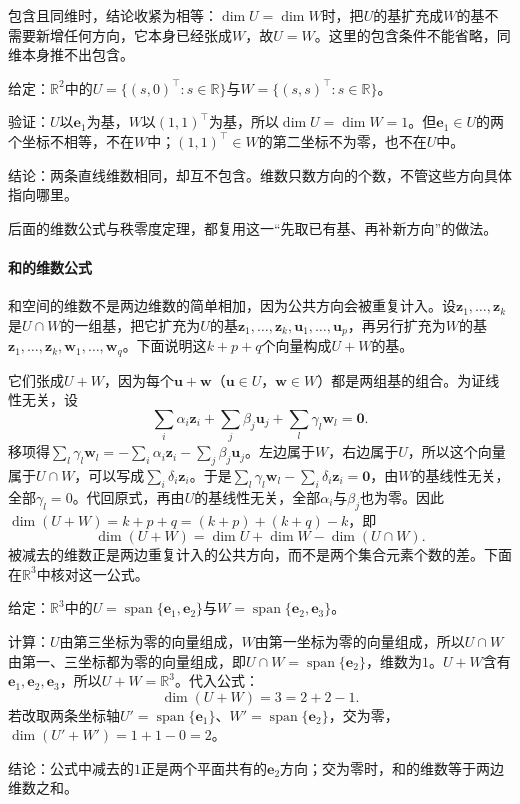 包含且同维时，结论收紧为相等：$\dim U=\dim W$时，把$U$的基扩充成$W$的基不需要新增任何方向，它本身已经张成$W$，故$U=W$。这里的包含条件不能省略，同维本身推不出包含。
\begin{example}[反例：同维而互不包含的两条直线]
\label{ex:ls-equal-dimension-not-nested}
给定：$\mathbb R^2$中的$U=\{(s,0)^\top:s\in\mathbb R\}$与$W=\{(s,s)^\top:s\in\mathbb R\}$。

验证：$U$以$\bm e_1$为基，$W$以$(1,1)^\top$为基，所以$\dim U=\dim W=1$。但$\bm e_1\in U$的两个坐标不相等，不在$W$中；$(1,1)^\top\in W$的第二坐标不为零，也不在$U$中。

结论：两条直线维数相同，却互不包含。维数只数方向的个数，不管这些方向具体指向哪里。
\end{example}
后面的维数公式与秩零度定理，都复用这一“先取已有基、再补新方向”的做法。

\paragraph{和的维数公式}
和空间的维数不是两边维数的简单相加，因为公共方向会被重复计入。设$\bm z_1,\ldots,\bm z_k$是$U\cap W$的一组基，把它扩充为$U$的基$\bm z_1,\ldots,\bm z_k,\bm u_1,\ldots,\bm u_p$，再另行扩充为$W$的基$\bm z_1,\ldots,\bm z_k,\bm w_1,\ldots,\bm w_q$。下面说明这$k+p+q$个向量构成$U+W$的基。

它们张成$U+W$，因为每个$\bm u+\bm w$（$\bm u\in U$，$\bm w\in W$）都是两组基的组合。为证线性无关，设
\[
 \sum_i\alpha_i\bm z_i+\sum_j\beta_j\bm u_j+\sum_l\gamma_l\bm w_l=\bm0 .
\]
移项得$\sum_l\gamma_l\bm w_l=-\sum_i\alpha_i\bm z_i-\sum_j\beta_j\bm u_j$。左边属于$W$，右边属于$U$，所以这个向量属于$U\cap W$，可以写成$\sum_i\delta_i\bm z_i$。于是$\sum_l\gamma_l\bm w_l-\sum_i\delta_i\bm z_i=\bm0$，由$W$的基线性无关，全部$\gamma_l=0$。代回原式，再由$U$的基线性无关，全部$\alpha_i$与$\beta_j$也为零。因此$\dim(U+W)=k+p+q=(k+p)+(k+q)-k$，即
\begin{equation}
 \dim(U+W)=\dim U+\dim W-\dim(U\cap W).
 \label{eq:ls-dimension-formula}
\end{equation}
被减去的维数正是两边重复计入的公共方向，而不是两个集合元素个数的差。下面在$\mathbb R^3$中核对这一公式。
\begin{example}[两个坐标平面的和]
\label{ex:ls-dimension-formula-planes}
给定：$\mathbb R^3$中的$U=\operatorname{span}\{\bm e_1,\bm e_2\}$与$W=\operatorname{span}\{\bm e_2,\bm e_3\}$。

计算：$U$由第三坐标为零的向量组成，$W$由第一坐标为零的向量组成，所以$U\cap W$由第一、三坐标都为零的向量组成，即$U\cap W=\operatorname{span}\{\bm e_2\}$，维数为$1$。$U+W$含有$\bm e_1,\bm e_2,\bm e_3$，所以$U+W=\mathbb R^3$。代入公式：
\[
 \dim(U+W)=3=2+2-1 .
\]
若改取两条坐标轴$U'=\operatorname{span}\{\bm e_1\}$、$W'=\operatorname{span}\{\bm e_2\}$，交为零，$\dim(U'+W')=1+1-0=2$。

结论：公式中减去的$1$正是两个平面共有的$\bm e_2$方向；交为零时，和的维数等于两边维数之和。
\end{example}

